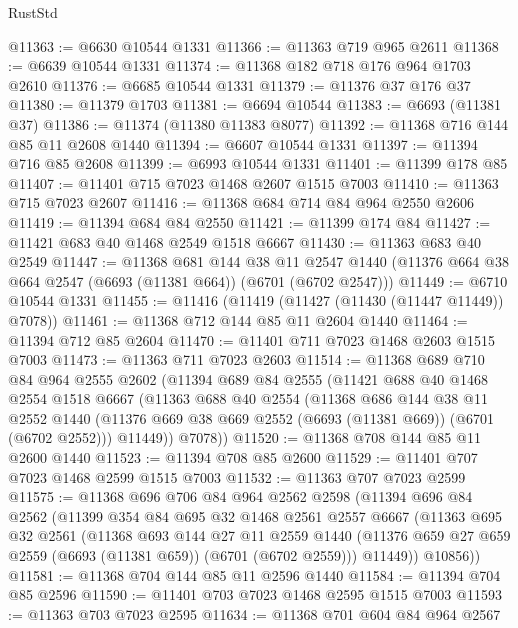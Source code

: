 \begin{lexlean}{RustStd}
\begin{coremodule}
@11363 := @6630 @10544 @1331
@11366 := @11363 @719 @965 @2611
@11368 := @6639 @10544 @1331
@11374 := @11368 @182 @718 @176 @964 @1703 @2610
@11376 := @6685 @10544 @1331
@11379 := @11376 @37 @176 @37
@11380 := @11379 @1703
@11381 := @6694 @10544
@11383 := @6693 (@11381 @37)
@11386 := @11374 (@11380 @11383 @8077)
@11392 := @11368 @716 @144 @85 @11 @2608 @1440
@11394 := @6607 @10544 @1331
@11397 := @11394 @716 @85 @2608
@11399 := @6993 @10544 @1331
@11401 := @11399 @178 @85
@11407 := @11401 @715 @7023 @1468 @2607 @1515 @7003
@11410 := @11363 @715 @7023 @2607
@11416 := @11368 @684 @714 @84 @964 @2550 @2606
@11419 := @11394 @684 @84 @2550
@11421 := @11399 @174 @84
@11427 := @11421 @683 @40 @1468 @2549 @1518 @6667
@11430 := @11363 @683 @40 @2549
@11447 := @11368
    @681
    @144
    @38
    @11
    @2547
    @1440
    (@11376 @664 @38 @664 @2547 (@6693 (@11381 @664)) (@6701 (@6702 @2547)))
@11449 := @6710 @10544 @1331
@11455 := @11416 (@11419 (@11427 (@11430 (@11447 @11449)) @7078))
@11461 := @11368 @712 @144 @85 @11 @2604 @1440
@11464 := @11394 @712 @85 @2604
@11470 := @11401 @711 @7023 @1468 @2603 @1515 @7003
@11473 := @11363 @711 @7023 @2603
@11514 := @11368
    @689
    @710
    @84
    @964
    @2555
    @2602
    (@11394
      @689
      @84
      @2555
      (@11421
        @688
        @40
        @1468
        @2554
        @1518
        @6667
        (@11363
          @688
          @40
          @2554
          (@11368
            @686
            @144
            @38
            @11
            @2552
            @1440
            (@11376 @669 @38 @669 @2552 (@6693 (@11381 @669)) (@6701 (@6702 @2552)))
            @11449))
        @7078))
@11520 := @11368 @708 @144 @85 @11 @2600 @1440
@11523 := @11394 @708 @85 @2600
@11529 := @11401 @707 @7023 @1468 @2599 @1515 @7003
@11532 := @11363 @707 @7023 @2599
@11575 := @11368
    @696
    @706
    @84
    @964
    @2562
    @2598
    (@11394
      @696
      @84
      @2562
      (@11399
        @354
        @84
        @695
        @32
        @1468
        @2561
        @2557
        @6667
        (@11363
          @695
          @32
          @2561
          (@11368
            @693
            @144
            @27
            @11
            @2559
            @1440
            (@11376 @659 @27 @659 @2559 (@6693 (@11381 @659)) (@6701 (@6702 @2559)))
            @11449))
        @10856))
@11581 := @11368 @704 @144 @85 @11 @2596 @1440
@11584 := @11394 @704 @85 @2596
@11590 := @11401 @703 @7023 @1468 @2595 @1515 @7003
@11593 := @11363 @703 @7023 @2595
@11634 := @11368
    @701
    @604
    @84
    @964
    @2567

\end{coremodule}
\end{lexlean}
